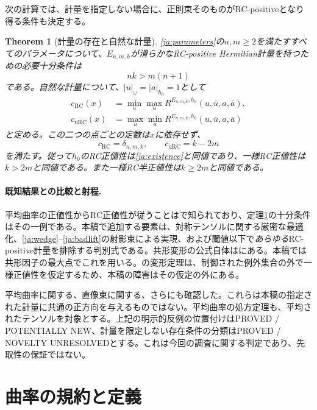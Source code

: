 \documentclass[12pt]{amsart}
\newtheorem{thm}{Theorem}[section]
\theoremstyle{definition}
\theoremstyle{remark}
\numberwithin{equation}{section}
\newcommand{\urc}{\mathrm{uRC}}
\newcommand{\rc}{\mathrm{RC}}
\newcommand{\E}{E_{n,m,k}}
\newcommand{\cst}{\delta_{n,m,k}}
\newcommand{\state}[2]{\textnormal{\textsf{#1 / #2}}}
\newcommand{\jref}[1]{\eqref{ja:#1}}
\begin{document}
次の計算では、計量を指定しない場合に、正則束そのものがRC-positiveとなり得る条件も決定する。

\begin{thm}[計量の存在と自然な計量]\label{ja:classification}
\jref{parameters}の$n,m\ge2$を満たすすべてのパラメータについて、$\E$が滑らかなRC-positive Hermitian計量を持つための必要十分条件は
\begin{equation}\label{ja:existence}
nk>m(n+1)
\end{equation}
である。自然な計量について、$|u|_\omega=|a|_{h_0}=1$として
\begin{align}
c_{\rc}(x)&=\min_a\max_u R^{\E,h_0}(u,\bar u,a,\bar a),\label{ja:rcconstant}\\
c_{\urc}(x)&=\max_u\min_a R^{\E,h_0}(u,\bar u,a,\bar a)\label{ja:urcconstant}
\end{align}
と定める。この二つの点ごとの定数は$x$に依存せず、
\begin{equation}\label{ja:constants}
c_{\rc}=\cst,\qquad c_{\urc}=k-2m
\end{equation}
を満たす。従って$h_0$のRC正値性は\jref{existence}と同値であり、一様RC正値性は$k>2m$と同値である。また一様RC半正値性は$k\ge2m$と同値である。
\end{thm}

\paragraph{既知結果との比較と射程.}
平均曲率の正値性からRC正値性が従うことは\cite[Theorem~3.6]{ja:Y18}で知られており、定理\ref{ja:classification}の十分条件はその一例である。本稿で追加する要素は、対称テンソルに関する厳密な最適化、\jref{wedge}--\jref{badlift}の射影束による実現、および閾値以下で\emph{あらゆる}RC-positive計量を排除する判別式である。共形変形の公式自体は\cite[Lemma~3.4]{ja:Y20}にある。本稿では共形因子の最大点でこれを用いる。\cite[Theorem~3.5]{ja:Y20}の変形定理は、制御された例外集合の外で一様正値性を仮定するため、本稿の障害はその仮定の外にある。

平均曲率に関する\cite[Theorem~1.4]{ja:LZZ}、直像束に関する\cite[Theorem~3]{ja:Wu25}、さらに\cite[Theorems~3 and~7]{ja:Wu26}も確認した。これらは本稿の指定された計量に共通の正方向を与えるものではない。平均曲率の処方定理\cite[Theorem~1.1]{ja:WYY}も、平均されたテンソルを対象とする。上記の明示的反例の位置付けは\state{PROVED}{POTENTIALLY NEW}、計量を限定しない存在条件の分類は\state{PROVED}{NOVELTY UNRESOLVED}とする。これは今回の調査に関する判定であり、先取性の保証ではない。

\section{曲率の規約と定義}
\end{document}
